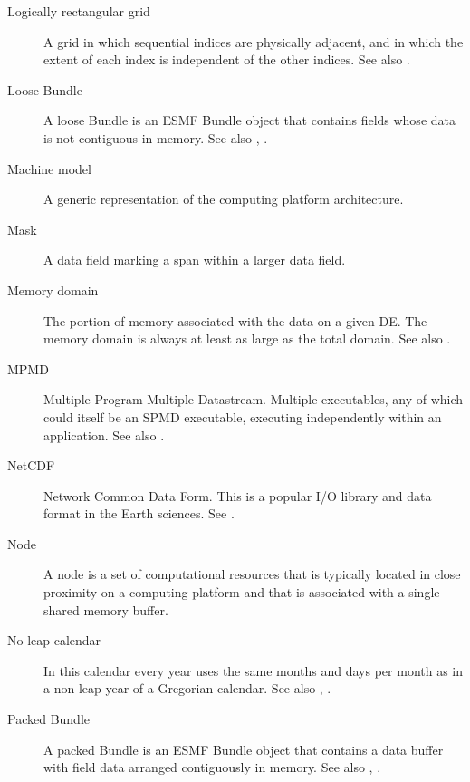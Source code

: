 \begin{description}
\label{glos:RecGrid} 
\item[Logically rectangular grid] 
  A grid in 
  which sequential indices are physically adjacent, and in which the 
  extent of each index is independent of the other indices.
  See also .

\label{glos:LooseBundle} 
\item[Loose Bundle] 
  A loose Bundle 
  is an ESMF Bundle object that contains fields whose data is 
  not contiguous in memory.  See also ,
  .

\item[Machine model] A generic representation of the computing 
  platform architecture.

\label{glos:Mask} 
\item[Mask] 
  A data field marking a span within a larger data field.

\label{glos:MemDomain} 
\item[Memory domain] 
  The portion of memory associated with the data on a given DE.  
  The memory domain is always at least 
  as large as the total domain.  See also .

\label{glos:MPMD} 
\item[MPMD] 
  Multiple Program Multiple Datastream.
  Multiple executables, any of which could itself be an SPMD
  executable, executing independently within an application. 
  See also .

\label{glos:NetCDF}
\item[NetCDF]
  Network Common Data Form.  This is a popular I/O library and data format
in the Earth sciences. See . 

\label{glos:Node} 
\item[Node] 
  A node is a set of computational resources
  that is typically located in close proximity on a computing platform
  and that is associated with a single shared memory buffer.

\label{glos:NoLeap} 
\item [No-leap calendar] 
  In this calendar every year uses the same months 
  and days per month as in a non-leap year of a Gregorian calendar.  See
  also , .

\label{glos:PackedBundle} 
\item[Packed Bundle] 
  A packed Bundle is an 
  ESMF Bundle object that contains
  a data buffer with field data arranged contiguously in memory. See 
  also , .


\end{description}

